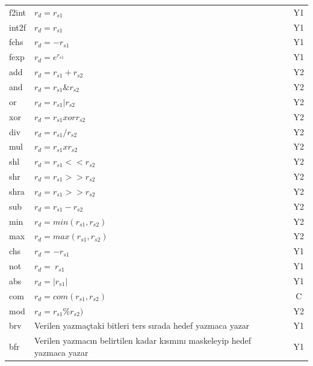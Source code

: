 \begin{longtable}{p{50pt} p{250pt} p{70pt}}
  f2int 	&	 $r_{d} = r_{s1}$ 							& \multicolumn{1}{c}{Y1}  		\\
  int2f		&	 $r_{d} = r_{s1}$ 							& \multicolumn{1}{c}{Y1}  		\\
  fchs		&	 $r_{d} = -r_{s1}$ 							& \multicolumn{1}{c}{Y1}  		\\
  fexp 		&	 $r_{d} = e^{r_{s1}}$						& \multicolumn{1}{c}{Y1}  		\\
  add 		&	 $r_{d} = r_{s1} + r_{s2}$ 			& \multicolumn{1}{c}{Y2}  		\\
  and 		&	 $r_{d} = r_{s1} \& r_{s2}$ 		& \multicolumn{1}{c}{Y2}  		\\
  or 			&	 $r_{d} = r_{s1} | r_{s2}$			& \multicolumn{1}{c}{Y2}  		\\
  xor			&	 $r_{d} = r_{s1} xor r_{s2}$ 		& \multicolumn{1}{c}{Y2}  		\\
  div  		&  $r_{d}	= r_{s1} / r_{s2}$			&	\multicolumn{1}{c}{Y2}		 	\\
  mul  		&  $r_{d} = r_{s1} x r_{s2}$			&	\multicolumn{1}{c}{Y2}		 	\\
  shl  		&  $r_{d} = r_{s1} << r_{s2}$			&	\multicolumn{1}{c}{Y2}		 	\\
  shr  		&  $r_{d} = r_{s1} >> r_{s2}$			&	\multicolumn{1}{c}{Y2}			\\
  shra  	&  $r_{d} = r_{s1} >> r_{s2}$			&	\multicolumn{1}{c}{Y2}		 	\\
  sub  		&  $r_{d} = r_{s1} - r_{s2}$			&	\multicolumn{1}{c}{Y2}		 	\\
  min  		&  $r_{d} = min(r_{s1},r_{s2})$		&	\multicolumn{1}{c}{Y2}		 	\\
  max  		&  $r_{d} = max(r_{s1},r_{s2})$		&	\multicolumn{1}{c}{Y2}		 	\\
  chs  		&  $r_{d} = -r_{s1}$							&	\multicolumn{1}{c}{Y1}		 	\\
  not  		&  $r_{d} = ~r_{s1}$							&	\multicolumn{1}{c}{Y1}		 	\\
  abs  		&  $r_{d} = |r_{s1}|$							&	\multicolumn{1}{c}{Y1}		 	\\
  com  		&  $r_{d} = com(r_{s1},r_{s2})$		& \multicolumn{1}{c}{C}			\\
  mod  		&  $r_{d} = r_{s1} \% r_{s2})$		& \multicolumn{1}{c}{Y2}			\\
  brv 		&	 Verilen yazmaçtaki bitleri ters sırada hedef yazmaca yazar & \multicolumn{1}{c}{Y1}  \\
  bfr 		&	 Verilen yazmacın belirtilen kadar kısmını maskeleyip hedef yazmaca yazar & \multicolumn{1}{c}{Y1}  \\

\end{longtable}
